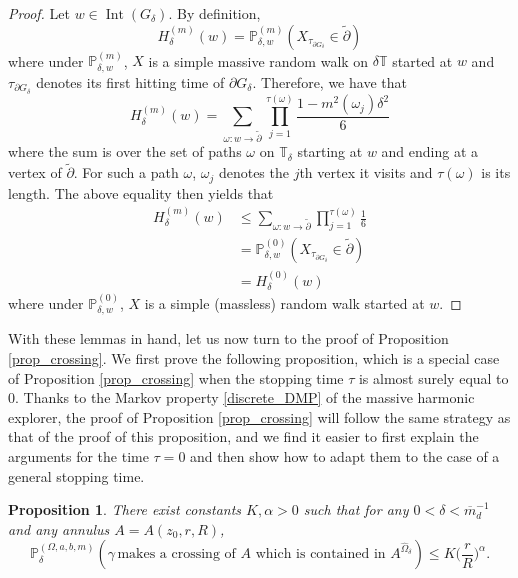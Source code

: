 \documentclass{article}
\newcommand{\PP}{{\mathbb{P}}}
\newtheorem{proposition}[theorem]{Proposition}
\theoremstyle{definition}
\theoremstyle{remark}
\theoremstyle{remark}
\begin{document}
\begin{proof}
Let $w \in \operatorname{Int}(G_{\delta})$. By definition,
\begin{equation*}
    H_{\delta}^{(m)}(w) = \PP_{\delta, w}^{(m)}(X_{\tau_{\partial G_{\delta}}} \in \tilde \partial)
\end{equation*}
where under $\PP_{\delta,w}^{(m)}$, $X$ is a simple massive random walk on $\delta\mathbb{T}$ started at $w$ and $\tau_{\partial G_{\delta}}$ denotes its first hitting time of $\partial G_{\delta}$. Therefore, we have that
\begin{equation*}
     H_{\delta}^{(m)}(w) = \sum_{\omega: w \to \tilde \partial} \prod_{j=1}^{\tau(\omega)} \frac{1-m^{2}(\omega_j)\delta^2}{6}
\end{equation*}
where the sum is over the set of paths $\omega$ on $\mathbb{T}_{\delta}$ starting at $w$ and ending at a vertex of $\tilde \partial$. For such a path $\omega$, $\omega_{j}$ denotes the $j$th vertex it visits and $\tau(\omega)$ is its length. The above equality then yields that
\begin{align*}
    H_{\delta}^{(m)}(w) &\leq \sum_{\omega: w \to \tilde \partial} \prod_{j=1}^{\tau(\omega)} \frac{1}{6} \\
    &= \PP_{\delta, w}^{(0)}(X_{\tau_{\partial G_{\delta}}} \in \tilde \partial) \\
    &= H_{\delta}^{(0)}(w)
\end{align*}
where under $\PP_{\delta,w}^{(0)}$, $X$ is a simple (massless) random walk started at $w$.
\end{proof}

With these lemmas in hand, let us now turn to the proof of Proposition \ref{prop_crossing}. We first prove the following proposition, which is a special case of Proposition \ref{prop_crossing} when the stopping time $\tau$ is almost surely equal to $0$. Thanks to the Markov property \eqref{discrete_DMP} of the massive harmonic explorer, the proof of Proposition \ref{prop_crossing} will follow the same strategy as that of the proof of this proposition, and we find it easier to first explain the arguments for the time $\tau=0$ and then show how to adapt them to the case of a general stopping time.

\begin{proposition} \label{prop_crossing_0}
There exist constants $K, \alpha>0$ such that for any $0<\delta<\overline{m}_d^{-1}$ and any annulus $A=A(z_0,r,R)$,
\begin{equation} \label{crossing_0}
    \PP_{\delta}^{(\Omega,a,b,m)}(\gamma \, \text{makes a crossing of $A$ which is contained in $A^{\hat \Omega_{\delta}}$}) \leq K \bigg (\frac{r}{R}\bigg)^{\alpha}.
\end{equation}
\end{proposition}
\end{document}
